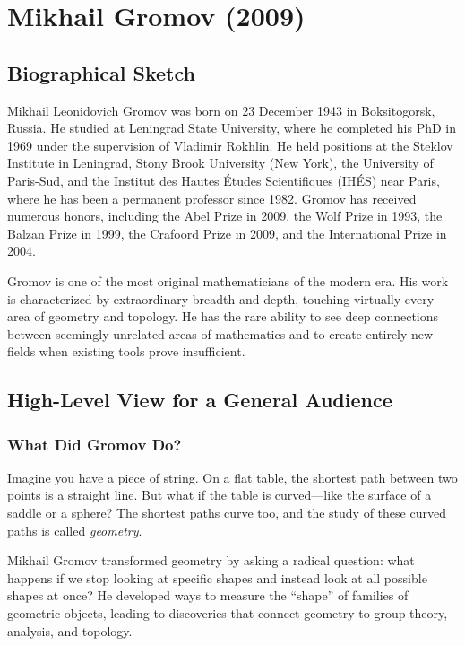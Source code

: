 \chapter{Mikhail Gromov (2009)}

\section{Biographical Sketch}

Mikhail Leonidovich Gromov was born on 23 December 1943 in Boksitogorsk, Russia. He studied at Leningrad State University, where he completed his PhD in 1969 under the supervision of Vladimir Rokhlin. He held positions at the Steklov Institute in Leningrad, Stony Brook University (New York), the University of Paris-Sud, and the Institut des Hautes \'Etudes Scientifiques (IH\'ES) near Paris, where he has been a permanent professor since 1982. Gromov has received numerous honors, including the Abel Prize in 2009, the Wolf Prize in 1993, the Balzan Prize in 1999, the Crafoord Prize in 2009, and the International Prize in 2004.

Gromov is one of the most original mathematicians of the modern era. His work is characterized by extraordinary breadth and depth, touching virtually every area of geometry and topology. He has the rare ability to see deep connections between seemingly unrelated areas of mathematics and to create entirely new fields when existing tools prove insufficient.

\section{High-Level View for a General Audience}

\subsection{What Did Gromov Do?}

Imagine you have a piece of string. On a flat table, the shortest path between two points is a straight line. But what if the table is curved---like the surface of a saddle or a sphere? The shortest paths curve too, and the study of these curved paths is called \emph{geometry}.

Mikhail Gromov transformed geometry by asking a radical question: what happens if we stop looking at specific shapes and instead look at all possible shapes at once? He developed ways to measure the ``shape'' of families of geometric objects, leading to discoveries that connect geometry to group theory, analysis, and topology.

